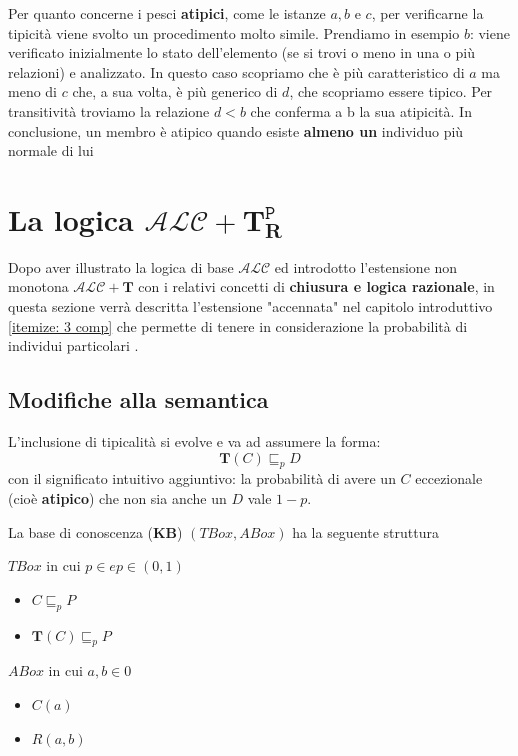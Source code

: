 Per quanto concerne i pesci \textbf{atipici}, come le istanze $ a,b \text{ e } c $, per verificarne la tipicità 
viene svolto un procedimento molto simile. Prendiamo in esempio $ b $: viene verificato inizialmente lo stato
dell'elemento (se si trovi o meno in una o più relazioni) e analizzato. In questo caso scopriamo che è più 
caratteristico di $ a $ ma meno di $ c $ che, a sua volta, è più generico di $ d $, che scopriamo essere tipico.
Per transitività troviamo la relazione $ d < b $ che conferma a b la sua atipicità.
In conclusione, un membro è atipico quando esiste \textbf{almeno un} individuo più normale di lui

\section{La logica $ \mathcal{ALC} + \mathbf{T}_{\mathbf{R}}^{\mathtt{P}} $}
Dopo aver illustrato la logica di base $ \mathcal{ALC} $ ed introdotto l’estensione non monotona
$ \mathcal{ALC} + \mathbf{T} $ con i relativi concetti di \textbf{chiusura e logica razionale}, in questa sezione
verrà descritta l’estensione "accennata" nel capitolo introduttivo \ref{itemize: 3 comp} che permette di tenere in considerazione la probabilità di individui particolari \cite{ProbOfEx}.

\subsection{Modifiche alla semantica }
L'inclusione di tipicalità si evolve e va ad assumere la forma:
\[ \mathbf{T}(C) \sqsubseteq_{p} D \]
con il significato intuitivo aggiuntivo: la probabilità di avere un $ C $ eccezionale (cioè \textbf{atipico})
che non sia anche un $ D $ vale $ 1-p $.

La base di conoscenza (\textbf{KB}) $ (TBox,ABox) $ ha la seguente struttura
\begin{multicols}{2}
	$ TBox $ in cui $ p \in \mathbb{} e p \in (0,1) $
	\begin{itemize}
		\item $ C \sqsubseteq_{p} P $
		\item $ \mathbf{T}(C) \sqsubseteq_{p} P $
	\end{itemize} 
	$ ABox $ in cui $ a,b \in \mathcal{0} $
	\begin{itemize}
		\item $ C(a) $
		\item $ R(a,b) $
	\end{itemize}
\end{multicols}

